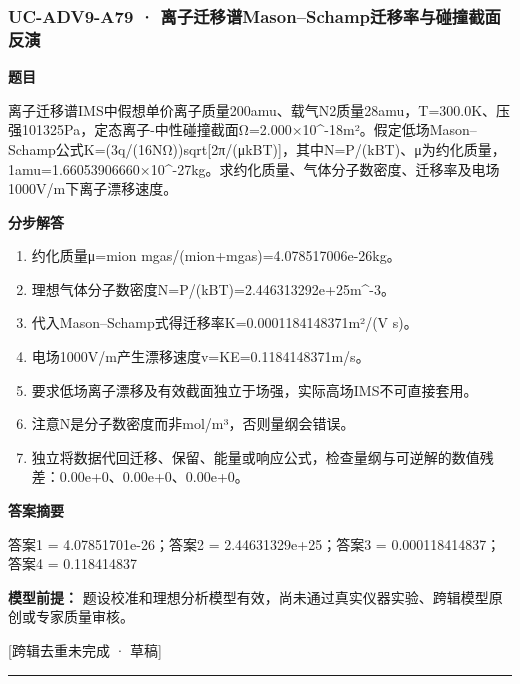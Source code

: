 \documentclass[UTF8,11pt,a4paper]{ctexart}
\begin{document}
\subsubsection*{UC-ADV9-A79 · 离子迁移谱Mason–Schamp迁移率与碰撞截面反演}
\noindent\textbf{题目}\par
离子迁移谱IMS中假想单价离子质量200amu、载气N2质量28amu，T=300.0K、压强101325Pa，定态离子-中性碰撞截面Ω=2.000×10\textasciicircum{}-18m²。假定低场Mason–Schamp公式K=(3q/(16NΩ))sqrt[2π/(μkBT)]，其中N=P/(kBT)、μ为约化质量，1amu=1.66053906660×10\textasciicircum{}-27kg。求约化质量、气体分子数密度、迁移率及电场1000V/m下离子漂移速度。\par
\medskip\noindent\textbf{分步解答}
\begin{enumerate}
\item 约化质量μ=mion mgas/(mion+mgas)=4.078517006e-26kg。
\item 理想气体分子数密度N=P/(kBT)=2.446313292e+25m\textasciicircum{}-3。
\item 代入Mason–Schamp式得迁移率K=0.0001184148371m²/(V s)。
\item 电场1000V/m产生漂移速度v=KE=0.1184148371m/s。
\item 要求低场离子漂移及有效截面独立于场强，实际高场IMS不可直接套用。
\item 注意N是分子数密度而非mol/m³，否则量纲会错误。
\item 独立将数据代回迁移、保留、能量或响应公式，检查量纲与可逆解的数值残差：0.00e+0、0.00e+0、0.00e+0。
\end{enumerate}
\noindent\textbf{答案摘要}\par
答案1 = 4.07851701e-26；答案2 = 2.44631329e+25；答案3 = 0.000118414837；答案4 = 0.118414837\par
\noindent\textbf{模型前提：}
题设校准和理想分析模型有效，尚未通过真实仪器实验、跨辑模型原创或专家质量审核。\par
\noindent\textcolor{red!65!black}{[跨辑去重未完成 · 草稿]} \par
\medskip\hrule\medskip
{}
\end{document}
